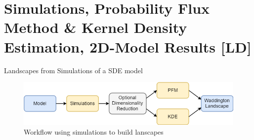 \documentclass{beamer}
\begin{document}
\section{Simulations, Probability Flux Method \& Kernel Density Estimation, 2D-Model Results [LD]}

\begin{frame}{Landscapes from Simulations of a SDE model}
\begin{figure}
\centering
\includegraphics[width=1.0\textwidth]{PFMworkflow.png}
\caption{Workflow using simulations to build lanscapes}\label{pfmworkflow}
\end{figure}
\end{frame}
\end{document}

